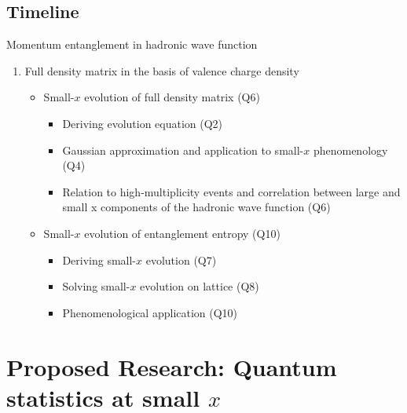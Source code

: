     \subsection{Timeline}
        \label{sec:p22}
Momentum entanglement in hadronic wave function
        \begin{enumerate}
            \item Full density matrix  in the basis 
				of valence charge density
                \begin{itemize}
                    \item Small-$x$ evolution of full density matrix (Q6)
                        \begin{itemize}
                            \item Deriving evolution equation (Q2)
                            \item Gaussian approximation and application to small-$x$ 
								phenomenology (Q4)
                            \item Relation to high-multiplicity events and correlation between large and small x components of the hadronic  wave function (Q6)
                        \end{itemize}
                    \item  Small-$x$ evolution of entanglement entropy   (Q10)
                        \begin{itemize}
                            \item Deriving small-$x$ evolution (Q7)
                            \item Solving small-$x$ evolution on lattice (Q8)
                            \item Phenomenological application  (Q10)
                        \end{itemize}
                \end{itemize}
        \end{enumerate}

\section{Proposed Research: Quantum statistics at small $x$}
    \label{sec:p3}

    \vspace{0.5em}
